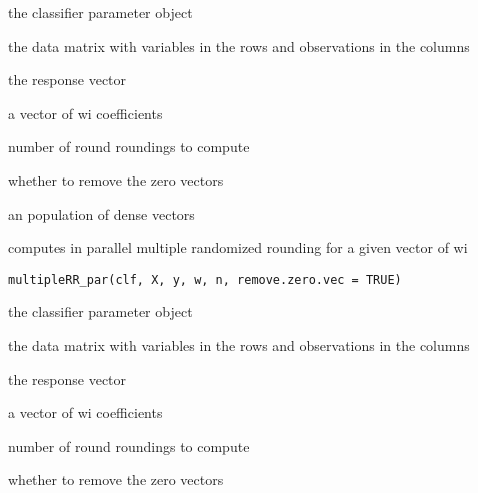 \documentclass[a4paper]{book}
\begin{document}
%
\begin{Arguments}
\begin{ldescription}
\item[\code{clf:}] the classifier parameter object

\item[\code{X:}] the data matrix with variables in the rows and observations in the columns

\item[\code{y:}] the response vector

\item[\code{w:}] a vector of wi coefficients

\item[\code{n:}] number of round roundings to compute

\item[\code{remove.zero.vec:}] whether to remove the zero vectors
\end{ldescription}
\end{Arguments}
%
\begin{Value}
an population of dense vectors
\end{Value}
%
\begin{Description}
computes in parallel multiple randomized rounding for a given vector of wi
\end{Description}
%
\begin{Usage}
\begin{verbatim}
multipleRR_par(clf, X, y, w, n, remove.zero.vec = TRUE)
\end{verbatim}
\end{Usage}
%
\begin{Arguments}
\begin{ldescription}
\item[\code{clf:}] the classifier parameter object

\item[\code{X:}] the data matrix with variables in the rows and observations in the columns

\item[\code{y:}] the response vector

\item[\code{w:}] a vector of wi coefficients

\item[\code{n:}] number of round roundings to compute

\item[\code{remove.zero.vec:}] whether to remove the zero vectors
\end{ldescription}
\end{Arguments}
\end{document}
